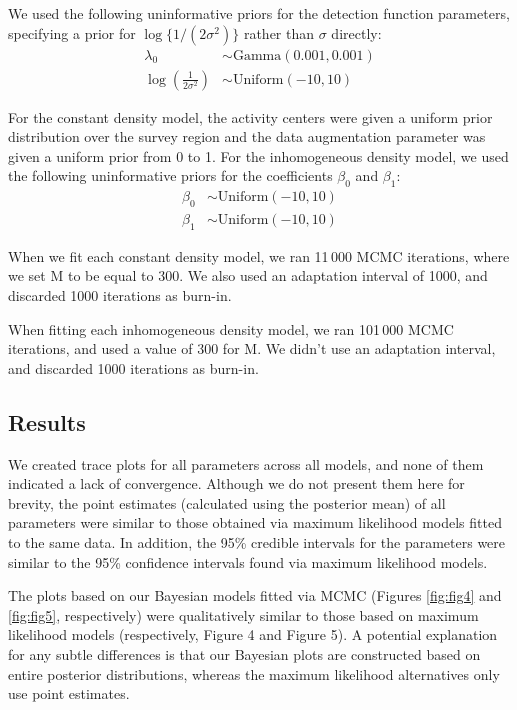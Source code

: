 \documentclass[10pt,a4paper]{article}\usepackage[]{graphicx}\usepackage[]{xcolor}
\begin{document}
We used the following uninformative priors for the detection function
parameters, specifying a prior for $\log\{1/(2\sigma^2)\}$ rather than
$\sigma$ directly:
\begin{align*}
  \lambda_0 &\sim \text{Gamma}(0.001, 0.001) \\
  \log\left(\frac{1}{2\sigma^2}\right) &\sim \text{Uniform}(-10, 10)
\end{align*}

For the constant density model, the activity centers were given a
uniform prior distribution over the survey region and the data
augmentation parameter was given a uniform prior from 0 to 1. For the
inhomogeneous density model, we used the following uninformative
priors for the coefficients $\beta_0$ and $\beta_1$:
\begin{align*}
\beta_0 &\sim \text{Uniform}(-10, 10) \\
\beta_1 &\sim \text{Uniform}(-10, 10)
\end{align*}

When we fit each constant density model, we ran 11\,000 MCMC
iterations, where we set M to be equal to 300. We also used an
adaptation interval of 1000, and discarded 1000 iterations as burn-in.

When fitting each inhomogeneous density model, we ran 101\,000 MCMC
iterations, and used a value of 300 for M. We didn't use an
adaptation interval, and discarded 1000 iterations as burn-in.

\subsection{Results}
\label{sec:appendix-results}

We created trace plots for all parameters across all models, and none
of them indicated a lack of convergence. Although we do not present
them here for brevity, the point estimates (calculated using the
posterior mean) of all parameters were similar to those obtained
via maximum likelihood models fitted to the same data. In addition,
the 95\% credible intervals for the parameters were similar to the
95\% confidence intervals found via maximum likelihood models. 

The plots based on our Bayesian models fitted via MCMC (Figures
\ref{fig:fig4} and \ref{fig:fig5}, respectively) were qualitatively
similar to those based on maximum likelihood models (respectively,
Figure 4 and Figure 5). A
potential explanation for any subtle differences is that our Bayesian
plots are constructed based on entire posterior distributions, whereas
the maximum likelihood alternatives only use point estimates.
\end{document}
